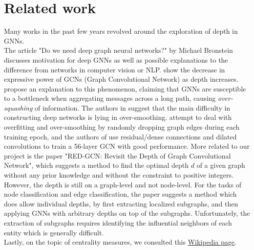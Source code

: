 \documentclass[11pt,a4paper]{article}
\begin{document}
\section{Related work}
\label{sec:RelatedWork}
	Many works in the past few years revolved around the exploration of depth in GNNs.\\
	The article "Do we need deep graph neural networks?" by Michael Bronstein \cite{towardsdatascience} discusses motivation for deep GNNs as well as possible explanations to the difference from networks in computer vision or NLP. \cite{oono2019graph} show the decrease in expressive power of GCNs (Graph Convolutional Network) as depth increases. \cite{alon2020bottleneck} propose an explanation to this phenomenon, claiming that GNNs are susceptible to a bottleneck when aggregating messages across a long path, causing \textit{over-squashing} of information. The authors in \cite{li2018deeper} suggest that the main difficulty in constructing deep networks is lying in over-smoothing. \cite{rong2019dropedge} attempt to deal with overfitting and over-smoothing by randomly dropping graph edges during each training epoch, and the authors of \cite{li2019deepgcns} use residual/dense connections and dilated convolutions to train a 56-layer GCN with good performance.
	More related to our project is the paper "RED-GCN: Revisit the Depth of Graph Convolutional Network", which suggests a method to find the optimal depth $d$ of a given graph without any prior knowledge and without the constraint to positive integers. However, the depth is still on a graph-level and not node-level. For the tasks of node classification and edge classification, the paper \cite{zeng2021decoupling} suggests a method which does allow individual depths, by first extracting localized subgraphs, and then applying GNNs with arbitrary depths on top of the subgraphs. Unfortunately, the extraction of subgraphs requires identifying the influential neighbors of each entity which is generally difficult.\\
	Lastly, on the topic of centrality measures, we consulted this \href{https://en.wikipedia.org/wiki/Centrality}{Wikipedia page}.
\end{document}
